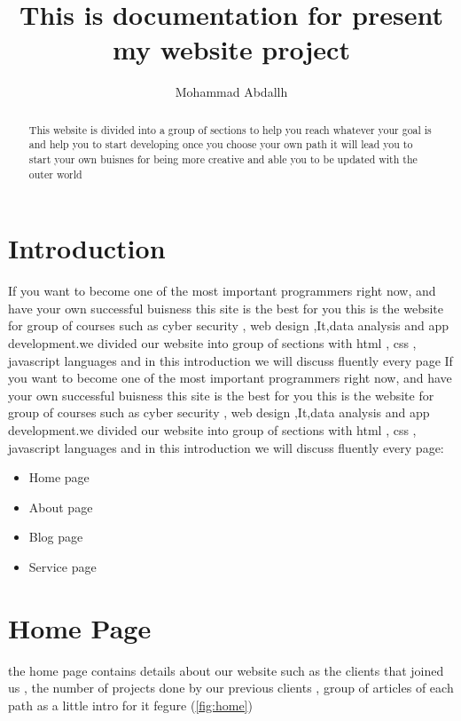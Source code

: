 \documentclass{article}
\begin{document}
\graphicspath{ {./images/} }

\title{This is documentation for present my website project} 
\author{Mohammad Abdallh}
\maketitle

\begin{abstract}
 This website is divided into a group of sections to help you reach whatever your goal is and help you to start developing once you choose your own path it will lead you to start your own buisnes for being more creative and able you to be updated with the outer world
\end{abstract}

\section{Introduction}
If you want to become one of the most important programmers right now, and have your own successful buisness this site is the best for you this is the website for group of courses such as cyber security , web design ,It,data analysis and app development.we divided our website into group of sections with html , css , javascript languages and in this introduction we will discuss fluently every page If you want to become one of the most important programmers right now, and have your own successful buisness this site is the best for you this is the website for group of courses such as cyber security , web design ,It,data analysis and app development.we divided our website into group of sections with html , css , javascript languages and in this introduction we will discuss fluently every page:

\begin{itemize}
\item Home page 
\item About page 
\item Blog page
\item Service page
\end{itemize}


\section{Home Page}
the home page contains details about our website such as the clients that joined us , the number of projects done by our previous clients , group of articles of each path as a little intro for it fegure (\ref{fig:home})
\end{document}
